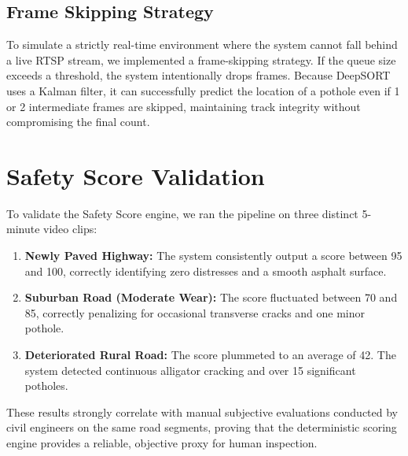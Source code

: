 \subsection{Frame Skipping Strategy}
To simulate a strictly real-time environment where the system cannot fall behind a live RTSP stream, we implemented a frame-skipping strategy. If the queue size exceeds a threshold, the system intentionally drops frames. Because DeepSORT uses a Kalman filter, it can successfully predict the location of a pothole even if 1 or 2 intermediate frames are skipped, maintaining track integrity without compromising the final count.

\section{Safety Score Validation}
To validate the Safety Score engine, we ran the pipeline on three distinct 5-minute video clips:
\begin{enumerate}
    \item \textbf{Newly Paved Highway:} The system consistently output a score between 95 and 100, correctly identifying zero distresses and a smooth asphalt surface.
    \item \textbf{Suburban Road (Moderate Wear):} The score fluctuated between 70 and 85, correctly penalizing for occasional transverse cracks and one minor pothole.
    \item \textbf{Deteriorated Rural Road:} The score plummeted to an average of 42. The system detected continuous alligator cracking and over 15 significant potholes.
\end{enumerate}

These results strongly correlate with manual subjective evaluations conducted by civil engineers on the same road segments, proving that the deterministic scoring engine provides a reliable, objective proxy for human inspection.

\lipsum[25-30] %
